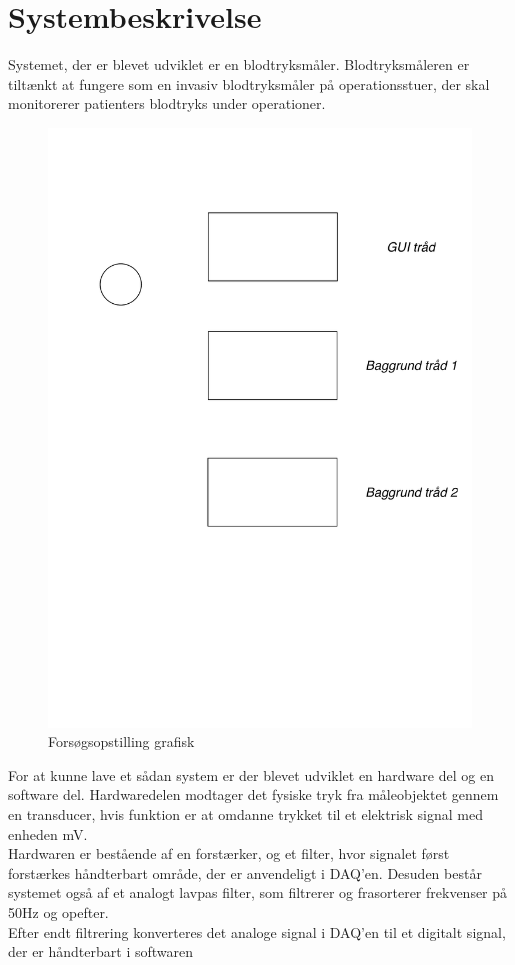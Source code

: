 \chapter{Systembeskrivelse}
Systemet, der er blevet udviklet er en blodtryksmåler. Blodtryksmåleren er tiltænkt at fungere som en invasiv blodtryksmåler på operationsstuer, der skal monitorerer patienters blodtryks under operationer.\\

\begin{figure}[H]
	\centering
	\includegraphics[width=1\textwidth]{Figurer/Systembeskrivelse}
	\caption{Forsøgsopstilling grafisk}
	\label{opstilling}
\end{figure} 
For at kunne lave et sådan system er der blevet udviklet en hardware del og en software del. 
Hardwaredelen modtager det fysiske tryk fra måleobjektet gennem en transducer, hvis funktion er at omdanne trykket til et elektrisk signal med enheden mV.\\
Hardwaren er bestående af en forstærker, og et filter, hvor signalet først forstærkes håndterbart område, der er anvendeligt i DAQ'en. Desuden består systemet også af et analogt lavpas filter, som filtrerer og frasorterer frekvenser på 50Hz og opefter.\\
Efter endt filtrering konverteres det analoge signal i DAQ'en til et digitalt signal, der er håndterbart i softwaren\\[1ex]

